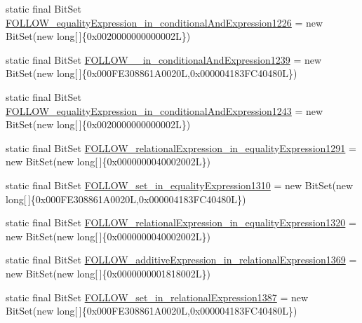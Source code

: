 \begin{DoxyCompactItemize}
static final Bit\-Set \hyperlink{classorg_1_1tzi_1_1use_1_1parser_1_1testsuite_1_1_test_suite_parser_a236c59c8426ed69cc69bbafc5cd48102}{F\-O\-L\-L\-O\-W\-\_\-equality\-Expression\-\_\-in\-\_\-conditional\-And\-Expression1226} = new Bit\-Set(new long\mbox{[}$\,$\mbox{]}\{0x0020000000000002\-L\})
\item 
static final Bit\-Set \hyperlink{classorg_1_1tzi_1_1use_1_1parser_1_1testsuite_1_1_test_suite_parser_a09d5af46d36ba62f9fa03691a3843638}{F\-O\-L\-L\-O\-W\-\_\-\_\-in\-\_\-conditional\-And\-Expression1239} = new Bit\-Set(new long\mbox{[}$\,$\mbox{]}\{0x000\-F\-E308861\-A0020\-L,0x000004183\-F\-C40480\-L\})
\item 
static final Bit\-Set \hyperlink{classorg_1_1tzi_1_1use_1_1parser_1_1testsuite_1_1_test_suite_parser_a1fa19c98fc4397e11894a034c43ef820}{F\-O\-L\-L\-O\-W\-\_\-equality\-Expression\-\_\-in\-\_\-conditional\-And\-Expression1243} = new Bit\-Set(new long\mbox{[}$\,$\mbox{]}\{0x0020000000000002\-L\})
\item 
static final Bit\-Set \hyperlink{classorg_1_1tzi_1_1use_1_1parser_1_1testsuite_1_1_test_suite_parser_a21ec8f9f1a17148695a6d07be7cbdd4f}{F\-O\-L\-L\-O\-W\-\_\-relational\-Expression\-\_\-in\-\_\-equality\-Expression1291} = new Bit\-Set(new long\mbox{[}$\,$\mbox{]}\{0x0000000040002002\-L\})
\item 
static final Bit\-Set \hyperlink{classorg_1_1tzi_1_1use_1_1parser_1_1testsuite_1_1_test_suite_parser_ab92534c8a761c3941cb5e0416b51c394}{F\-O\-L\-L\-O\-W\-\_\-set\-\_\-in\-\_\-equality\-Expression1310} = new Bit\-Set(new long\mbox{[}$\,$\mbox{]}\{0x000\-F\-E308861\-A0020\-L,0x000004183\-F\-C40480\-L\})
\item 
static final Bit\-Set \hyperlink{classorg_1_1tzi_1_1use_1_1parser_1_1testsuite_1_1_test_suite_parser_af593dfd36caa774068c0b29a06ba5064}{F\-O\-L\-L\-O\-W\-\_\-relational\-Expression\-\_\-in\-\_\-equality\-Expression1320} = new Bit\-Set(new long\mbox{[}$\,$\mbox{]}\{0x0000000040002002\-L\})
\item 
static final Bit\-Set \hyperlink{classorg_1_1tzi_1_1use_1_1parser_1_1testsuite_1_1_test_suite_parser_aa8938128be859f8f965103f26b0e5bfd}{F\-O\-L\-L\-O\-W\-\_\-additive\-Expression\-\_\-in\-\_\-relational\-Expression1369} = new Bit\-Set(new long\mbox{[}$\,$\mbox{]}\{0x0000000001818002\-L\})
\item 
static final Bit\-Set \hyperlink{classorg_1_1tzi_1_1use_1_1parser_1_1testsuite_1_1_test_suite_parser_a1ab0098822ae64e9f1653e2337652ea7}{F\-O\-L\-L\-O\-W\-\_\-set\-\_\-in\-\_\-relational\-Expression1387} = new Bit\-Set(new long\mbox{[}$\,$\mbox{]}\{0x000\-F\-E308861\-A0020\-L,0x000004183\-F\-C40480\-L\})

\end{DoxyCompactItemize}
